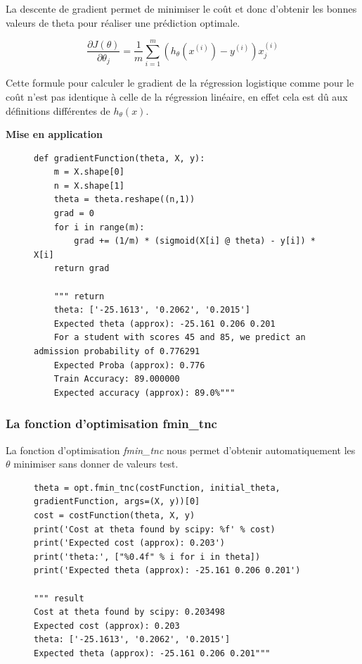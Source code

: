 La descente de gradient permet de minimiser le coût et donc d'obtenir les bonnes valeurs de theta pour réaliser une prédiction optimale.

\begin{equation}\label{eq:descente-gradient}
    \frac{\partial J(\theta)}{\partial \theta_j} = \frac{1}{m} \sum_{i=1}^{m} (h_\theta(x^{(i)}) - y^{(i)}) x_j^{(i)}
\end{equation}

\noindent
Cette formule pour calculer le gradient de la régression logistique comme pour le coût n'est pas identique à celle de la régression linéaire, en effet cela est dû aux définitions différentes de \( h_\theta (x) \).

\vspace{.5cm}
    \noindent
    \textbf{Mise en application}
    \vspace{.2cm}

\begin{figure}[!h]
\begin{verbatim}
def gradientFunction(theta, X, y):
    m = X.shape[0]  
    n = X.shape[1]   
    theta = theta.reshape((n,1)) 
    grad = 0
    for i in range(m):
        grad += (1/m) * (sigmoid(X[i] @ theta) - y[i]) * X[i]
    return grad

    """ return 
    theta: ['-25.1613', '0.2062', '0.2015']
    Expected theta (approx): -25.161 0.206 0.201
    For a student with scores 45 and 85, we predict an admission probability of 0.776291
    Expected Proba (approx): 0.776
    Train Accuracy: 89.000000
    Expected accuracy (approx): 89.0%"""
\end{verbatim}   
\end{figure}

\subsubsection{La fonction d'optimisation fmin\_tnc}

La fonction d'optimisation \textit{fmin\_tnc} nous permet d'obtenir automatiquement les $\theta$ minimiser sans donner de valeurs test. 

\begin{figure}[!h]
\begin{verbatim}
theta = opt.fmin_tnc(costFunction, initial_theta, gradientFunction, args=(X, y))[0]
cost = costFunction(theta, X, y)  
print('Cost at theta found by scipy: %f' % cost)
print('Expected cost (approx): 0.203')
print('theta:', ["%0.4f" % i for i in theta])
print('Expected theta (approx): -25.161 0.206 0.201')

""" result
Cost at theta found by scipy: 0.203498
Expected cost (approx): 0.203
theta: ['-25.1613', '0.2062', '0.2015']
Expected theta (approx): -25.161 0.206 0.201"""
\end{verbatim}   
\end{figure}

